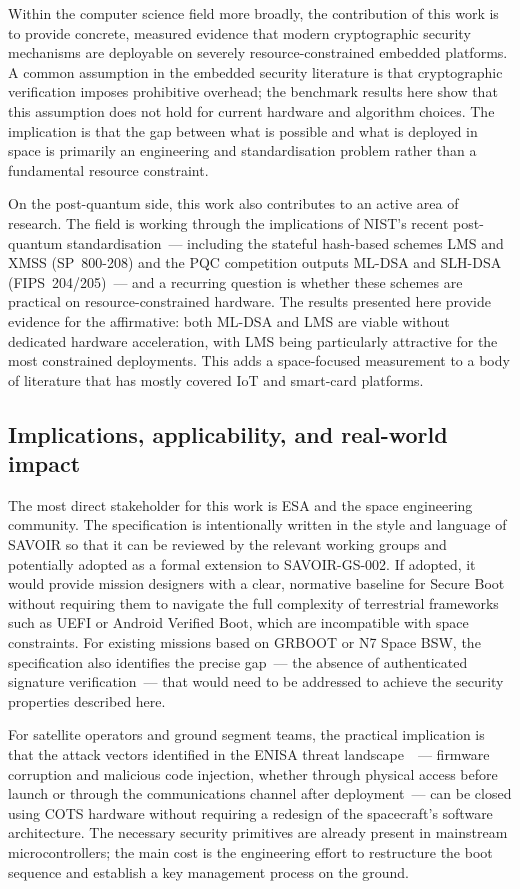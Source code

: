 Within the computer science field more broadly, the contribution of this work is to provide concrete, measured evidence that modern cryptographic security mechanisms are deployable on severely resource-constrained embedded platforms. A common assumption in the embedded security literature is that cryptographic verification imposes prohibitive overhead; the benchmark results here show that this assumption does not hold for current hardware and algorithm choices. The implication is that the gap between what is possible and what is deployed in space is primarily an engineering and standardisation problem rather than a fundamental resource constraint.

On the post-quantum side, this work also contributes to an active area of research. The field is working through the implications of NIST's recent post-quantum standardisation~--- including the stateful hash-based schemes LMS and XMSS (SP~800-208) and the PQC competition outputs ML-DSA and SLH-DSA (FIPS~204/205)~--- and a recurring question is whether these schemes are practical on resource-constrained hardware. The results presented here provide evidence for the affirmative: both ML-DSA and LMS are viable without dedicated hardware acceleration, with LMS being particularly attractive for the most constrained deployments. This adds a space-focused measurement to a body of literature that has mostly covered IoT and smart-card platforms.

\subsection{Implications, applicability, and real-world impact}

The most direct stakeholder for this work is ESA and the space engineering community. The specification is intentionally written in the style and language of SAVOIR so that it can be reviewed by the relevant working groups and potentially adopted as a formal extension to SAVOIR-GS-002. If adopted, it would provide mission designers with a clear, normative baseline for Secure Boot without requiring them to navigate the full complexity of terrestrial frameworks such as UEFI or Android Verified Boot, which are incompatible with space constraints. For existing missions based on GRBOOT or N7 Space BSW, the specification also identifies the precise gap~--- the absence of authenticated signature verification~--- that would need to be addressed to achieve the security properties described here.

For satellite operators and ground segment teams, the practical implication is that the attack vectors identified in the ENISA threat landscape~\cite{enisa_2025}~--- firmware corruption and malicious code injection, whether through physical access before launch or through the communications channel after deployment~--- can be closed using COTS hardware without requiring a redesign of the spacecraft's software architecture. The necessary security primitives are already present in mainstream microcontrollers; the main cost is the engineering effort to restructure the boot sequence and establish a key management process on the ground.

